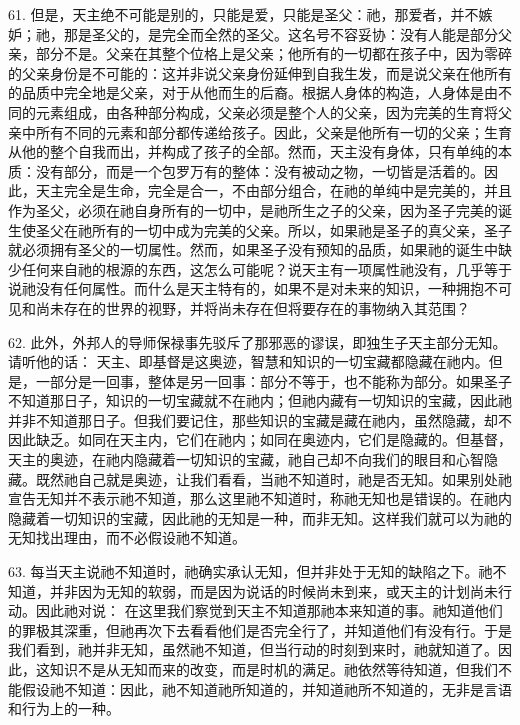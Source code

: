 61. 但是，天主绝不可能是别的，只能是爱，只能是圣父：祂，那爱者，并不嫉妒；祂，那是圣父的，是完全而全然的圣父。这名号不容妥协：没有人能是部分父亲，部分不是。父亲在其整个位格上是父亲；他所有的一切都在孩子中，因为零碎的父亲身份是不可能的：这并非说父亲身份延伸到自我生发，而是说父亲在他所有的品质中完全地是父亲，对于从他而生的后裔。根据人身体的构造，人身体是由不同的元素组成，由各种部分构成，父亲必须是整个人的父亲，因为完美的生育将父亲中所有不同的元素和部分都传递给孩子。因此，父亲是他所有一切的父亲；生育从他的整个自我而出，并构成了孩子的全部。然而，天主没有身体，只有单纯的本质：没有部分，而是一个包罗万有的整体：没有被动之物，一切皆是活着的。因此，天主完全是生命，完全是合一，不由部分组合，在祂的单纯中是完美的，并且作为圣父，必须在祂自身所有的一切中，是祂所生之子的父亲，因为圣子完美的诞生使圣父在祂所有的一切中成为完美的父亲。所以，如果祂是圣子的真父亲，圣子就必须拥有圣父的一切属性。然而，如果圣子没有预知的品质，如果祂的诞生中缺少任何来自祂的根源的东西，这怎么可能呢？说天主有一项属性祂没有，几乎等于说祂没有任何属性。而什么是天主特有的，如果不是对未来的知识，一种拥抱不可见和尚未存在的世界的视野，并将尚未存在但将要存在的事物纳入其范围？\par

62. 此外，外邦人的导师保禄事先驳斥了那邪恶的谬误，即独生子天主部分无知。请听他的话： 天主、即基督是这奥迹，智慧和知识的一切宝藏都隐藏在祂内。但是，一部分是一回事，整体是另一回事：部分不等于，也不能称为部分。如果圣子不知道那日子，知识的一切宝藏就不在祂内；但祂内藏有一切知识的宝藏，因此祂并非不知道那日子。但我们要记住，那些知识的宝藏是藏在祂内，虽然隐藏，却不因此缺乏。如同在天主内，它们在祂内；如同在奥迹内，它们是隐藏的。但基督，天主的奥迹，在祂内隐藏着一切知识的宝藏，祂自己却不向我们的眼目和心智隐藏。既然祂自己就是奥迹，让我们看看，当祂不知道时，祂是否无知。如果别处祂宣告无知并不表示祂不知道，那么这里祂不知道时，称祂无知也是错误的。在祂内隐藏着一切知识的宝藏，因此祂的无知是一种，而非无知。这样我们就可以为祂的无知找出理由，而不必假设祂不知道。\par

63. 每当天主说祂不知道时，祂确实承认无知，但并非处于无知的缺陷之下。祂不知道，并非因为无知的软弱，而是因为说话的时候尚未到来，或天主的计划尚未行动。因此祂对说： 在这里我们察觉到天主不知道那祂本来知道的事。祂知道他们的罪极其深重，但祂再次下去看看他们是否完全行了，并知道他们有没有行。于是我们看到，祂并非无知，虽然祂不知道，但当行动的时刻到来时，祂就知道了。因此，这知识不是从无知而来的改变，而是时机的满足。祂依然等待知道，但我们不能假设祂不知道：因此，祂不知道祂所知道的，并知道祂所不知道的，无非是言语和行为上的一种。\par

